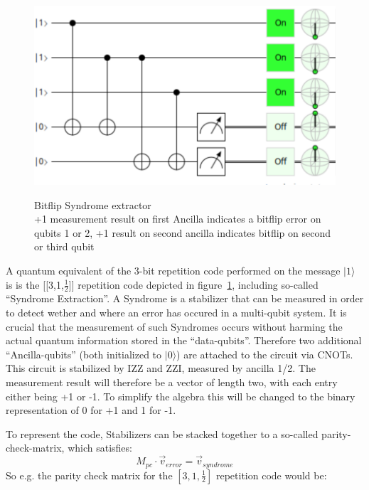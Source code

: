 \begin{figure}[h!]
	\begin{center}
	\captionsetup{justification=centering,margin=2cm}
	\includegraphics[scale=0.2]{./img/bitflipSyndromeExtraction3Rep.png}\\
	\caption{Bitflip Syndrome extractor\\
        +1 measurement result on first Ancilla indicates a bitflip error
        on qubits 1 or 2, +1 result on second ancilla indicates 
		bitflip on second or third qubit}
	\label{fig: syndrome extractor}
	\end{center}
\end{figure}

A quantum equivalent of the 3-bit repetition code performed on
the message $|1\rangle$ is is the [[3,1,$\frac{1}{2}$]] repetition
code depicted in 
figure~\ref{fig: syndrome extractor}, including so-called
``Syndrome Extraction''. A Syndrome is a stabilizer that can be
measured in order to detect wether and where an error has occured
in a multi-qubit system. It is crucial that the 
measurement of such Syndromes occurs without harming the actual
quantum information stored in the ``data-qubits''. Therefore
two additional ``Ancilla-qubits'' (both initialized to 
$|0\rangle$) are attached to the circuit via CNOTs.
This circuit is stabilized by IZZ and ZZI, measured by ancilla 
1/2. The measurement result will therefore be a vector of length
two, with each entry either being +1 or -1. To simplify the 
algebra this will be changed to the binary representation of 0 
for +1 and 1 for -1. 

To represent the code, Stabilizers can be stacked together to
a so-called parity-check-matrix, which satisfies:
\begin{equation}
	M_{pc}\cdot \vec{v}_{error} = \vec{v}_{syndrome}
\end{equation}
So e.g. the parity check matrix for the $[3,1,\frac{1}{2}]$
repetition code would be:

